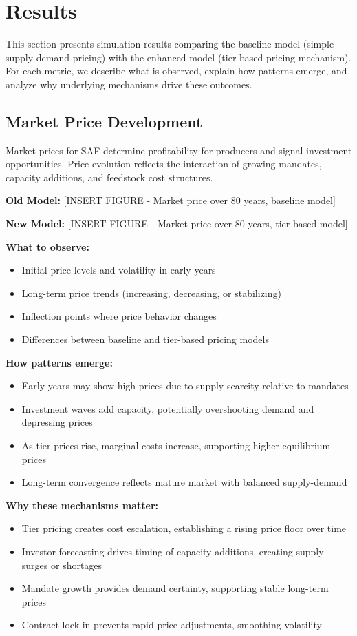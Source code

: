 \documentclass[10.5pt]{article}
\begin{document}
\newpage
\section{Results}

This section presents simulation results comparing the baseline model (simple supply-demand pricing) with the enhanced model (tier-based pricing mechanism). For each metric, we describe what is observed, explain how patterns emerge, and analyze why underlying mechanisms drive these outcomes.

\subsection{Market Price Development}

Market prices for SAF determine profitability for producers and signal investment opportunities. Price evolution reflects the interaction of growing mandates, capacity additions, and feedstock cost structures.

\textbf{Old Model:} [INSERT FIGURE - Market price over 80 years, baseline model]

\textbf{New Model:} [INSERT FIGURE - Market price over 80 years, tier-based model]

\textbf{What to observe:}
\begin{itemize}
    \item Initial price levels and volatility in early years
    \item Long-term price trends (increasing, decreasing, or stabilizing)
    \item Inflection points where price behavior changes
    \item Differences between baseline and tier-based pricing models
\end{itemize}

\textbf{How patterns emerge:}
\begin{itemize}
    \item Early years may show high prices due to supply scarcity relative to mandates
    \item Investment waves add capacity, potentially overshooting demand and depressing prices
    \item As tier prices rise, marginal costs increase, supporting higher equilibrium prices
    \item Long-term convergence reflects mature market with balanced supply-demand
\end{itemize}

\textbf{Why these mechanisms matter:}
\begin{itemize}
    \item Tier pricing creates cost escalation, establishing a rising price floor over time
    \item Investor forecasting drives timing of capacity additions, creating supply surges or shortages
    \item Mandate growth provides demand certainty, supporting stable long-term prices
    \item Contract lock-in prevents rapid price adjustments, smoothing volatility
\end{itemize}
\end{document}
